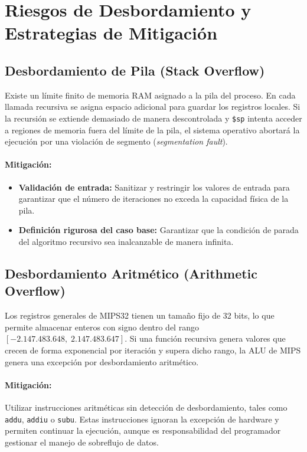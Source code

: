 \documentclass[12pt,a4paper]{article}
\begin{document}
\section{Riesgos de Desbordamiento y Estrategias de Mitigación}

\subsection{Desbordamiento de Pila (Stack Overflow)}
Existe un límite finito de memoria RAM asignado a la pila del proceso. En cada llamada recursiva se asigna espacio adicional para guardar los registros locales. Si la recursión se extiende demasiado de manera descontrolada y \texttt{\$sp} intenta acceder a regiones de memoria fuera del límite de la pila, el sistema operativo abortará la ejecución por una violación de segmento (\textit{segmentation fault}).

\paragraph{Mitigación:}
\begin{itemize}
    \item \textbf{Validación de entrada:} Sanitizar y restringir los valores de entrada para garantizar que el número de iteraciones no exceda la capacidad física de la pila.
    \item \textbf{Definición rigurosa del caso base:} Garantizar que la condición de parada del algoritmo recursivo sea inalcanzable de manera infinita.
\end{itemize}

\subsection{Desbordamiento Aritmético (Arithmetic Overflow)}
Los registros generales de MIPS32 tienen un tamaño fijo de 32 bits, lo que permite almacenar enteros con signo dentro del rango $[-2.147.483.648, \; 2.147.483.647]$. Si una función recursiva genera valores que crecen de forma exponencial por iteración y supera dicho rango, la ALU de MIPS genera una excepción por desbordamiento aritmético.

\paragraph{Mitigación:}
Utilizar instrucciones aritméticas sin detección de desbordamiento, tales como \texttt{addu}, \texttt{addiu} o \texttt{subu}. Estas instrucciones ignoran la excepción de hardware y permiten continuar la ejecución, aunque es responsabilidad del programador gestionar el manejo de sobreflujo de datos.
\end{document}
